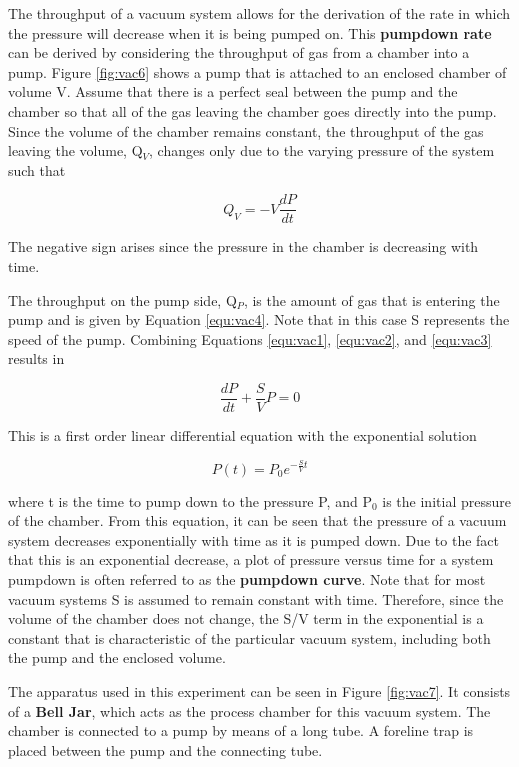 The throughput of a vacuum system allows for the derivation of the rate in which the pressure will decrease when it is being pumped on. This {\bf pumpdown rate} can be derived by considering the throughput of gas from a chamber into a pump. Figure \ref{fig:vac6} shows a pump that is attached to an enclosed chamber of volume V. Assume that there is a perfect seal between the pump and the chamber so that all of the gas leaving the chamber goes directly into the pump. Since the volume of the chamber remains constant, the throughput of the gas leaving the volume, Q$_V$, changes only due to the varying pressure of the system such that 

\begin{equation}
Q_V=-V\dfrac{dP}{dt}
\label{equ:vac3}
\end{equation}

\noindent The negative sign arises since the pressure in the chamber is decreasing with time.

The throughput on the pump side, Q$_P$, is the amount of gas that is entering the pump and is given by Equation \ref{equ:vac4}. Note that in this case S represents the speed of the pump. Combining Equations \ref{equ:vac1}, \ref{equ:vac2}, and \ref{equ:vac3} results in

\begin{equation}
\dfrac{dP}{dt}+\dfrac{S}{V}P=0
\label{equ:vac4}
\end{equation}

\noindent This is a first order linear differential equation with the exponential solution

\begin{equation}
P(t)=P_0e^{-\frac{S}{V}t}
\label{equ:vac5}
\end{equation}

\noindent where t is the time to pump down to the pressure P, and P$_0$ is the initial pressure of the chamber. From this equation, it can be seen that the pressure of a vacuum system decreases exponentially with time as it is pumped down. Due to the fact that this is an exponential decrease, a plot of pressure versus time for a system pumpdown is often referred to as the {\bf pumpdown curve}. Note that for most vacuum systems S is assumed to remain constant with time. Therefore, since the volume of the chamber does not change, the S/V term in the exponential is a constant that is characteristic of the particular vacuum system, including both the pump and the enclosed volume.

The apparatus used in this experiment can be seen in Figure \ref{fig:vac7}. It consists of a {\bf Bell Jar}, which acts as the process chamber for this vacuum system. The chamber is connected to a pump by means of a long tube. A foreline trap is placed between the pump and the connecting tube.

